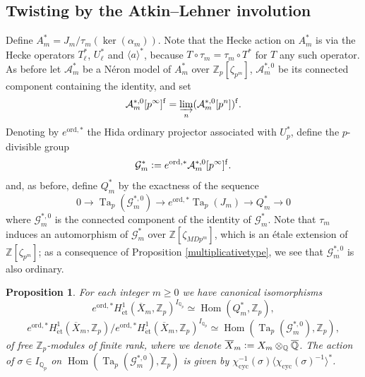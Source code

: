 \documentclass[a4paper,11pt]{amsart}
\numberwithin{equation}{section}
\theoremstyle{plain}
\newtheorem{proposition}[theorem]{Proposition}
\theoremstyle{definition}
\theoremstyle{remark}
\newcommand{\Q}{\mathbb{Q}}
\newcommand{\Z}{\mathbb{Z}}
\newcommand{\defeq}{\vcentcolon=}
\DeclareMathOperator{\Hom}{Hom}
\DeclareMathOperator{\Ta}{Ta}
\newcommand{\cyc}{{\mathrm{cyc}}}
\newcommand{\ord}{\mathrm{ord}}
\newcommand{\et}{\mathrm{\acute{e}t}}
\newcommand{\dirlim}{\mathop{\varinjlim}\limits}
\begin{document}
\subsection{Twisting by the Atkin--Lehner involution}
Define ${A}_m^*=J_m/\tau_m(\ker(\alpha_m))$. 
Note that the Hecke action on $A_m^*$ is via the Hecke operators $T_\ell^*$,  $U_\ell^*$ and $\langle a\rangle^*$, 
because $T\circ\tau_m=\tau_m\circ T^*$ for $T$ any such operator. 
As before let $\mathcal{A}_m^*$ be a N\'eron model of $A_m^*$ over $\Z_p[\zeta_{p^m}]$, $\mathcal{A}_m^{*,0}$ be
its connected component containing the identity, and set 
\[\mathcal{A}^{*,0}_m[p^\infty]^\mathrm{f}=\dirlim_n(\mathcal{A}_m^{*,0}[p^n])^\mathrm{f}.\]
{Denoting by $e^{\ord,*}$ the Hida ordinary projector associated with $U_p^*$,} define the $p$-divisible group 
\[\mathcal{G}_m^*\defeq e^{\ord,*}\mathcal{A}^{*,0}_m[p^\infty]^\mathrm{f}.\]
and, as before, define $Q_m^*$ by the exactness of the sequence
\begin{equation}\label{defQm*} 
0\longrightarrow \Ta_p(\mathcal{G}_m^{*,0})\longrightarrow e^{\ord,*}\Ta_p(J_m)
\longrightarrow Q_m^*\longrightarrow 0\end{equation}
where $\mathcal{G}_m^{*,0}$ is the connected component of the identity of $\mathcal{G}_m^*$. 
Note that $\tau_m$ induces an {automorphism} of $\mathcal{G}_m^*$ over $\Z[\zeta_{MDp^m}]$,
which is an \'etale extension of $\Z[\zeta_{p^m}]$; as a consequence of Proposition \ref{multiplicativetype}, we see that $\mathcal{G}_m^{*,0}$ is also ordinary. 

\begin{proposition}\label{isoprop1}
    For each integer $m\geq 0$ we have canonical isomorphisms
    \[e^{\ord,*}H^1_{\et}(\overline{X}_m,\Z_p)^{I_{\Q_p}}\simeq \Hom(Q_m^*,\Z_p),\]
    \[e^{\ord,*}H^1_{\et}(\overline{X}_m,\Z_p)/e^{\ord,* }H^1_{\et}(\overline{X}_m,\Z_p)^{I_{\Q_p}}\simeq \Hom(\Ta_p(\mathcal{G}_m^{*,0}),\Z_p),\]
    of free $\Z_p$-modules of finite rank, where we denote $\overline{X}_m\defeq X_m\otimes_{\Q}\overline{\Q}$. The action of $\sigma\in I_{{\Q_p}}$ on  
   $\Hom(\Ta_p(\mathcal{G}_m^{*,0}),\Z_p)$ is given by $\chi_\cyc^{-1}(\sigma)\langle \chi_\cyc(\sigma)^{-1}\rangle^*$.  
\end{proposition}
\end{document}

